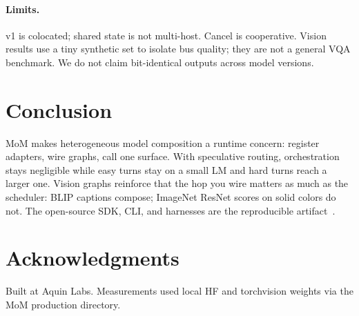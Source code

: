 \documentclass[11pt,a4paper]{article}
\begin{document}
\paragraph{Limits.}
v1 is colocated; shared state is not multi-host.
Cancel is cooperative.
Vision results use a tiny synthetic set to isolate bus quality; they are not a general VQA benchmark.
We do not claim bit-identical outputs across model versions.

\section{Conclusion}
\label{sec:conclusion}

MoM makes heterogeneous model composition a runtime concern: register adapters, wire graphs, call one surface.
With speculative routing, orchestration stays negligible while easy turns stay on a small LM and hard turns reach a larger one.
Vision graphs reinforce that the hop you wire matters as much as the scheduler: BLIP captions compose; ImageNet ResNet scores on solid colors do not.
The open-source SDK, CLI, and harnesses are the reproducible artifact~\cite{mom2025}.

\section*{Acknowledgments}
Built at Aquin Labs. Measurements used local HF and torchvision weights via the MoM production directory.



\end{document}
